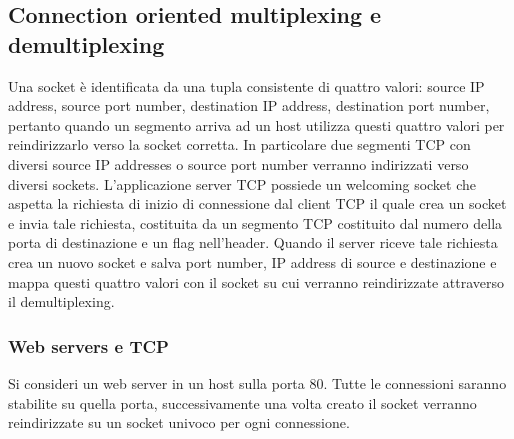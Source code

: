 \subsection{Connection oriented multiplexing e demultiplexing}
Una socket \`e identificata da una tupla consistente di quattro valori: source IP address, source port number, destination IP address, destination port 
number, pertanto quando un segmento arriva ad un host utilizza questi quattro valori per reindirizzarlo verso la socket corretta. In particolare due 
segmenti TCP con diversi source IP addresses o source port number verranno indirizzati verso diversi sockets. L'applicazione server TCP possiede un 
welcoming socket che aspetta la richiesta di inizio di connessione dal client TCP il quale crea un socket e invia tale richiesta, costituita da un segmento
TCP costituito dal numero della porta di destinazione e un flag nell'header. Quando il server riceve tale richiesta crea un nuovo socket e salva port 
number, IP address di source e destinazione e mappa questi quattro valori con il socket su cui verranno reindirizzate attraverso il demultiplexing. 
\subsubsection{Web servers e TCP}
Si consideri un web server in un host sulla porta 80. Tutte le connessioni saranno stabilite su quella porta, successivamente una volta creato il socket
verranno reindirizzate su un socket univoco per ogni connessione.
